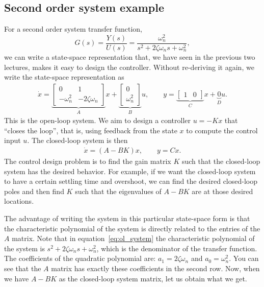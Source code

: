 \documentclass{ee122_notes}
\begin{document}
\subsection{Second order system example}
For a second order system transfer function, 
\[
G(s) = \frac{Y(s)}{U(s)} = \frac{\omega_n^2}{s^2 + 2\zeta \omega_n s + \omega_n^2},
\]
we can write a state-space representation that, we have seen in the previous two lectures, makes it easy to design the controller. Without re-deriving it again, we write the state-space representation as
\begin{align}
\dot{x} = \underbrace{\begin{bmatrix}0 & 1\\
-\omega_n^2 & -2\zeta \omega_n
\end{bmatrix}}_{A} x + \underbrace{\begin{bmatrix}0\\
\omega_n^2
\end{bmatrix}}_{B} u, \qquad y = \underbrace{\begin{bmatrix}1 & 0\end{bmatrix}}_{C} x + \underbrace{0}_{D} u.
\label{eq:ol_system}
\end{align}
This is the open-loop system. We aim to design a controller $u = - Kx$ that ``closes the loop'', that is, using feedback from the state $x$ to compute the control input $u$. The closed-loop system is then
\begin{align}
\dot{x} = (A - BK)x, \qquad y = Cx.
\label{eq:cl_system}
\end{align}
The control design problem is to find the gain matrix \(K\) such that the closed-loop system has the desired behavior. For example, if we want the closed-loop system to have a certain settling time and overshoot, we can find the desired closed-loop poles and then find \(K\) such that the eigenvalues of \(A - BK\) are at those desired locations.

The advantage of writing the system in this particular state-space form is that the characteristic polynomial of the system is directly related to the entries of the \(A\) matrix.
Note that in equation~\eqref{eq:ol_system} the characteristic polynomial of the system is $s^2 + 2\zeta \omega_n s + \omega_n^2$, which is the denominator of the transfer function. The coefficients of the quadratic polynomial are: $a_1 = 2\zeta \omega_n$ and $a_0 = \omega_n^2$. You can see that the $A$ matrix has exactly these coefficients in the second row. Now, when we have $A - BK$ as the closed-loop system matrix, let us obtain what we get. 
\end{document}
